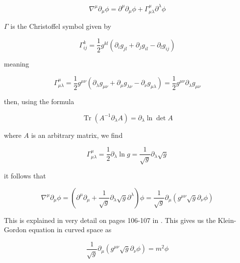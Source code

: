 \documentclass[a4paper,11pt]{article}
\numberwithin{equation}{section}
\numberwithin{figure}{section}
\begin{document}
\begin{large}
\begin{equation}
\label{covariant of vector}    
    \nabla^\mu\partial_\mu\phi=\partial^\mu \partial_\mu\phi+ \Gamma^\mu_{\mu\lambda} \partial^\lambda\phi
\end{equation}

$\Gamma$ is the Christoffel symbol given by

\begin{equation}
\label{Christoffel}
    \Gamma^k_{ij}=\frac{1}{2}g^{kl}(\partial_i g_{jl}+\partial_j g_{il}-\partial_l g_{ij})
\end{equation}

meaning 

\begin{equation}
\label{Christoffel1}    
    \Gamma^\mu_{\mu\lambda}=\frac{1}{2}g^{\mu\nu}(\partial_\lambda g_{\mu\nu}+\partial_\mu g_{\lambda\nu}-\partial_\nu g_{\mu\lambda})=\frac{1}{2} g^{\mu\nu}\partial_\lambda g_{\mu\nu}
\end{equation}

then, using the formula

\begin{equation}
\label{formula}    
    \operatorname{Tr}(A^{-1}\partial_\lambda A)=\partial_\lambda \ln \det A
\end{equation}

where $A$ is an arbitrary matrix, we find 

\begin{equation}
\label{Christoffel2}    
    \Gamma^\mu_{\mu\lambda}=\frac{1}{2} \partial_\lambda \ln g = \frac{1}{\sqrt{g}}\partial_\lambda \sqrt{g}
\end{equation}

it follows that

\begin{equation}
\label{d'Al}
    \nabla^\mu\partial_\mu\phi=(\partial^\mu\partial_\mu+\frac{1}{\sqrt{g}}\partial_\lambda \sqrt{g}\partial^\lambda)\phi=\frac{1}{\sqrt{g}}\partial_\mu (g^{\mu\nu}\sqrt{g}\partial_\nu \phi)
\end{equation}

This is explained in very detail on pages 106-107 in \cite{weinberg1972gravitation}. This gives us the Klein-Gordon equation in curved space as

\begin{equation}
\label{KG}
    \frac{1}{\sqrt{g}}\partial_\mu (g^{\mu\nu}\sqrt{g}\partial_\nu \phi)=m^2\phi
\end{equation}

\newpage


\end{large}
\end{document}
